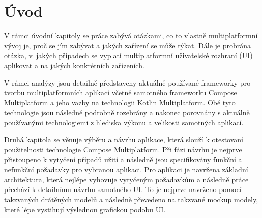 \chapter{Úvod}
\setcounter{page}{1}



V rámci úvodní kapitoly se práce zabývá otázkami, co to vlastně multiplatformní vývoj je, proč se jím zabývat a jakých zařízení se může týkat.
Dále je probrána otázka, v~jakých případech se vyplatí multiplatformní uživatelské rozhraní (UI) aplikovat a na jakých konkrétních zařízeních. 





V rámci analýzy jsou detailně představeny aktuálně používané frameworky pro tvorbu multiplatformních aplikací včetně samotného
frameworku Compose Multiplatform a jeho vazby na technologii Kotlin Multiplatform. Obě tyto technologie jsou následně podrobně rozebrány
a nakonec porovnány s aktuálně používanými technologiemi z hlediska výkonu a velikosti samotných aplikací.

\medskip

Druhá kapitola se věnuje výběru a návrhu aplikace, která slouží k otestovaní použitelnosti technologie Compose Multiplatform.
Při fázi návrhu je nejprve přistoupeno k vytyčení případů užití a následně jsou specifikovány funkční a nefunkční požadavky pro vybranou aplikaci.
Pro aplikaci je navržena základní architektura, která nejlépe vyhovuje vytyčeným požadavkům a následně práce přechází k detailnímu
návrhu samotného UI. To je nejprve navrženo pomocí takzvaných drátěných modelů a následně převedeno na takzvané mockup modely, které
lépe vystihují výslednou grafickou podobu UI.

